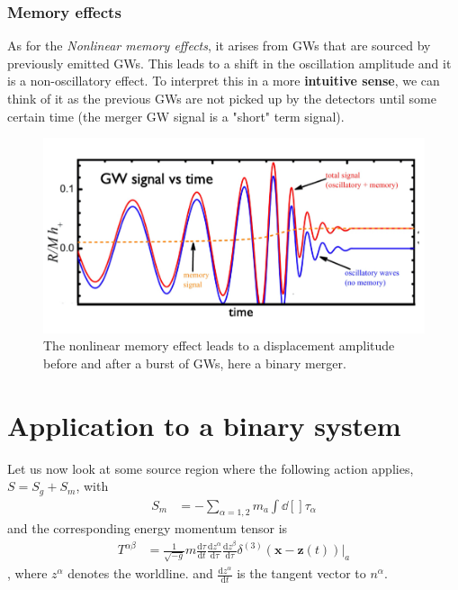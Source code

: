 \documentclass[a4paper, 12pt]{article}
\begin{document}
  \subsubsection{Memory effects}%
    \label{sub:Memory effects}
    As for the \textit{Nonlinear memory effects}, it arises from GWs that
    are sourced by previously emitted GWs. This leads to a shift in the
    oscillation amplitude and it is a non-oscillatory effect. To interpret
    this in a more \textbf{intuitive sense}, we can think of it as the
    previous GWs are not picked up by the detectors until some certain
    time (the merger GW signal is a "short" term signal).
    
    \begin{figure}[h!]
    \begin{center}
      \includegraphics[scale=0.3]{Figures/memory.jpeg}
    \end{center}
    \caption{The nonlinear memory effect leads to a displacement amplitude
      before and after a burst of GWs, here a binary merger.}
    \label{fig:memory}
    \end{figure}

    \section{Application to a binary system}%
      \label{sec:Application to a binary system}
      Let us now look at some source region where the following action
      applies, \( S = S_g + S_m \), with 
      \begin{align}
        \label{action m}
        S_m &= - \sum_{\alpha = 1, 2} m_a \int \dd[]{\tau_{\alpha}} 
      \end{align}
    and the corresponding energy momentum tensor is 
    \begin{align}
      \label{energy momentum tensor for application}
      T^{\alpha\beta} &= \frac{1}{\sqrt{-g} } m
      \frac{\mathrm{d}\tau}{\mathrm{d}t}
      \frac{\mathrm{d}z^{\alpha} }{\mathrm{d}\tau}
      \frac{\mathrm{d}z^{\beta} }{\mathrm{d}\tau}
      \delta^{(3)}(\textbf{x} - \textbf{z}(t))|_{a} 
    \end{align}, where \( z^{\alpha}  \) denotes the worldline. and \(
    \frac{\mathrm{d}z^{\alpha} }{\mathrm{d}t} \) is the tangent vector to
    \( n^{\alpha}  \). 
\end{document}
